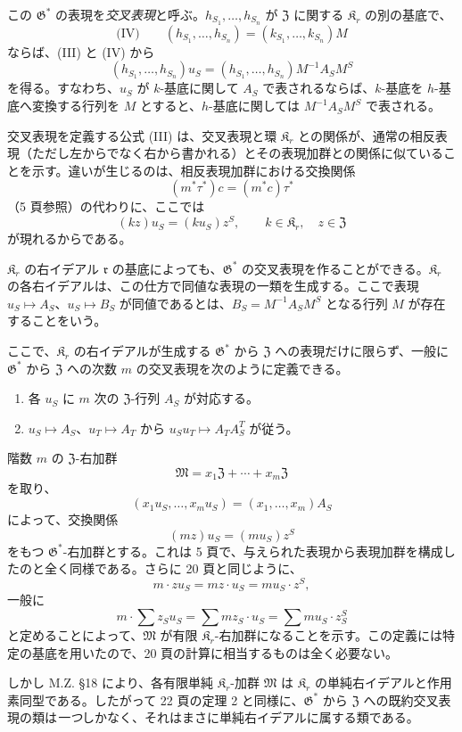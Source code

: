 この \(\mathfrak G^*\) の表現を\emph{交叉表現}と呼ぶ。\(h_{S_1},\ldots,h_{S_n}\) が \(\mathfrak Z\) に関する \(\mathfrak K_r\) の別の基底で、
\[
\text{(IV)}\qquad
(h_{S_1},\ldots,h_{S_n})=(k_{S_1},\ldots,k_{S_n})M
\]
ならば、(III) と (IV) から
\[
(h_{S_1},\ldots,h_{S_n})u_S
=(h_{S_1},\ldots,h_{S_n})M^{-1}A_SM^S
\]
を得る。すなわち、\(u_S\) が \(k\)-基底に関して \(A_S\) で表されるならば、\(k\)-基底を \(h\)-基底へ変換する行列を \(M\) とすると、\(h\)-基底に関しては \(M^{-1}A_SM^S\) で表される。

交叉表現を定義する公式 (III) は、交叉表現と環 \(\mathfrak K_r\) との関係が、通常の相反表現（ただし左からでなく右から書かれる）とその表現加群との関係に似ていることを示す。違いが生じるのは、相反表現加群における交換関係
\[
(m^*\tau^*)c=(m^*c)\tau^*
\]
（5 頁参照）の代わりに、ここでは
\[
(kz)u_S=(ku_S)z^S,\qquad
k\in\mathfrak K_r,\quad z\in\mathfrak Z
\]
が現れるからである。

\(\mathfrak K_r\) の右イデアル \(\mathfrak r\) の基底によっても、\(\mathfrak G^*\) の交叉表現を作ることができる。\(\mathfrak K_r\) の各右イデアルは、この仕方で同値な表現の一類を生成する。ここで表現 \(u_S\mapsto A_S\)、\(u_S\mapsto B_S\) が同値であるとは、\(B_S=M^{-1}A_SM^S\) となる行列 \(M\) が存在することをいう。

ここで、\(\mathfrak K_r\) の右イデアルが生成する \(\mathfrak G^*\) から \(\mathfrak Z\) への表現だけに限らず、一般に \(\mathfrak G^*\) から \(\mathfrak Z\) への次数 \(m\) の交叉表現を次のように定義できる。
\begin{enumerate}
\item 各 \(u_S\) に \(m\) 次の \(\mathfrak Z\)-行列 \(A_S\) が対応する。
\item \(u_S\mapsto A_S\)、\(u_T\mapsto A_T\) から \(u_Su_T\mapsto A_TA_S^T\) が従う。
\end{enumerate}

階数 \(m\) の \(\mathfrak Z\)-右加群
\[
\mathfrak M=x_1\mathfrak Z+\cdots+x_m\mathfrak Z
\]
を取り、
\[
(x_1u_S,\ldots,x_mu_S)=(x_1,\ldots,x_m)A_S
\]
によって、交換関係
\[
(mz)u_S=(mu_S)z^S
\]
をもつ \(\mathfrak G^*\)-右加群とする。これは 5 頁で、与えられた表現から表現加群を構成したのと全く同様である。さらに 20 頁と同じように、
\[
m\cdot zu_S=mz\cdot u_S=mu_S\cdot z^S,
\]
一般に
\[
m\cdot\sum z_Su_S=\sum mz_S\cdot u_S
=\sum mu_S\cdot z_S^S
\]
と定めることによって、\(\mathfrak M\) が有限 \(\mathfrak K_r\)-右加群になることを示す。この定義には特定の基底を用いたので、20 頁の計算に相当するものは全く必要ない。

しかし M.Z. \S 18 により、各有限単純 \(\mathfrak K_r\)-加群 \(\mathfrak M\) は \(\mathfrak K_r\) の単純右イデアルと作用素同型である。したがって 22 頁の定理 2 と同様に、\(\mathfrak G^*\) から \(\mathfrak Z\) への既約交叉表現の類は\emph{一つ}しかなく、それはまさに単純右イデアルに属する類である。

